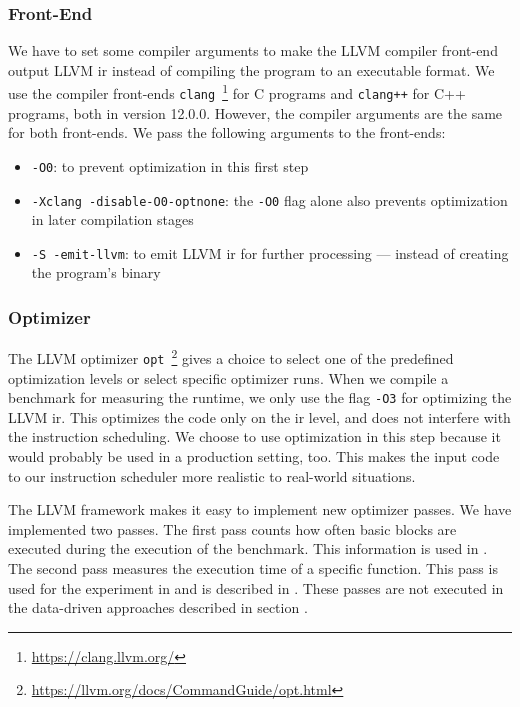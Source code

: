 \subsubsection{Front-End}
We have to set some compiler arguments to make the LLVM compiler front-end output LLVM \ac{ir} instead of compiling the program to an executable format.
We use the compiler front-ends \lstinline{clang}~\footnote{\url{https://clang.llvm.org/}} for C programs and \lstinline{clang++} for C++ programs, both in version 12.0.0.
However, the compiler arguments are the same for both front-ends.
We pass the following arguments to the front-ends:
\begin{itemize}
    \item \lstinline{-O0}: to prevent optimization in this first step
    \item \lstinline{-Xclang -disable-O0-optnone}: the \lstinline{-O0} flag alone also prevents optimization in later compilation stages
    \item \lstinline{-S -emit-llvm}: to emit LLVM \ac{ir} for further processing --- instead of creating the program's binary
\end{itemize}

\subsubsection{Optimizer}
The LLVM optimizer \lstinline{opt}~\footnote{\url{https://llvm.org/docs/CommandGuide/opt.html}} gives a choice to select one of the predefined optimization levels or select specific optimizer runs.
When we compile a benchmark for measuring the runtime, we only use the flag \lstinline{-O3} for optimizing the LLVM \ac{ir}.
This optimizes the code only on the \ac{ir} level, and does not interfere with the instruction scheduling.
We choose to use optimization in this step because it would probably be used in a production setting, too.
This makes the input code to our instruction scheduler more realistic to real-world situations.

The LLVM framework makes it easy to implement new optimizer passes.
We have implemented two passes.
The first pass counts how often basic blocks are executed during the execution of the benchmark.
This information is used in .
The second pass measures the execution time of a specific function.
This pass is used for the experiment in  and is described in .
These passes are not executed in the data-driven approaches described in section .

